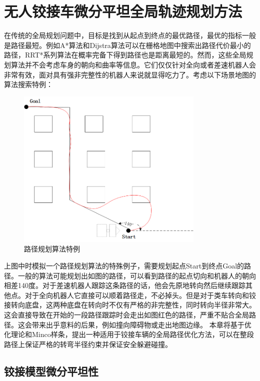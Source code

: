 \documentclass[master,academic]{ysuthesis} %
\begin{document}
	\chapter{无人铰接车微分平坦全局轨迹规划方法}

		在传统的全局规划问题中，目标是找到从起点到终点的最优路径，最优的指标一般是路径最短。例如A*算法和Dijstra算法可以在栅格地图中搜索出路径代价最小的路径，RRT*系列算法在概率完备下得到路径也是距离最短的。然而，这些全局规划算法并不会考虑车身的朝向和曲率等信息。它们仅仅针对全向或者差速机器人会非常有效，面对具有强非完整性的机器人来说就显得吃力了。考虑以下场景地图的算法搜索特例：  
		\begin{figure}[!ht]
			\centering
			\includegraphics[width=0.8\textwidth]{路径规划算法特例.png}
			\caption{路径规划算法特例}
			\label{fig:路径规划算法特例}
		\end{figure}
		上图中时模拟一个路径规划算法的特殊例子，需要规划起点Start到终点Goal的路径。一般的算法可能规划出如图的路径，可以看到路径的起点切向和机器人的朝向相差140度。对于差速机器人跟踪这条路径的话，他会先原地转向然后继续跟踪其他点。对于全向机器人它直接可以顺着路径走，不必掉头。但是对于类车转向和铰接转向底盘，这两种底盘在转向时不仅有严格的非完整性，同时转向半径非常大。这会直接导致在开始的一段路径跟踪时会走出如图红色的路径，严重不贴合全局路径。这会带来出乎意料的后果，例如撞向障碍物或走出地图边缘。
		本章将基于优化理论和Minco样条，提出一种适用于铰接车辆的全局路径优化方法，可以在整段路径上保证严格的转弯半径约束并保证安全躲避碰撞。
		

	\section{铰接模型微分平坦性}
\end{document}
